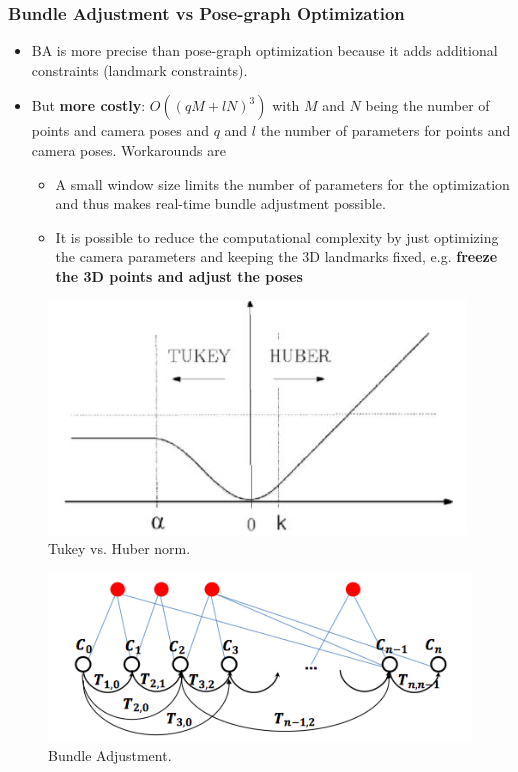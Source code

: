 \documentclass[a4paper,12 pt]{article}
\theoremstyle{definition}
\theoremstyle{remark}
\theoremstyle{definition}
\theoremstyle{definition}
\theoremstyle{definition}
\theoremstyle{remark}
\theoremstyle{definition}
\begin{document}
\subsubsection*{Bundle Adjustment vs Pose-graph Optimization}
\begin{itemize}
\item BA is more precise than pose-graph optimization because it adds additional constraints (landmark constraints).
\item But \textbf{more costly}: $O((qM+lN)^3)$ with $M$ and $N$ being the number of points and camera poses and $q$ and $l$ the number of parameters for points and camera poses. Workarounds are
\begin{itemize}
\item A small window size limits the number of parameters for the optimization and thus makes real-time bundle adjustment possible.
\item It is possible to reduce the computational complexity by just optimizing the camera parameters and keeping the 3D landmarks fixed, e.g. \textbf{freeze the 3D points and adjust the poses}
\end{itemize}
\end{itemize}
\begin{figure}[tbh]
\begin{center}
\includegraphics[scale=0.5]{pics/tukey}
\caption{Tukey vs. Huber norm.}
\end{center}
\end{figure}

\begin{figure}[tbh]
\begin{center}
\includegraphics[scale=0.5]{pics/bundle}
\caption{Bundle Adjustment.}
\end{center}
\end{figure}
\end{document}
